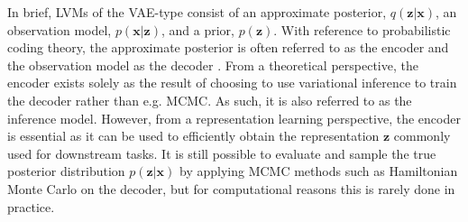 {In brief, LVMs of the VAE-type consist of an approximate posterior, $q(\mathbf{z}|\mathbf{x})$, an observation model, $p(\mathbf{x}|\mathbf{z})$, and a prior, $p(\mathbf{z})$. 
With reference to probabilistic coding theory, the approximate posterior is often referred to as the encoder and the observation model as the decoder \parencite{kingma_autoencoding_2014, rezende_stochastic_2014}. From a theoretical perspective, the encoder exists solely as the result of choosing to use variational inference to train the decoder rather than e.g. MCMC. As such, it is also referred to as the inference model. However, from a representation learning perspective, the encoder is essential as it can be used to efficiently obtain the representation $\mathbf{z}$ commonly used for downstream tasks. 
It is still possible to evaluate and sample the true posterior distribution $p(\mathbf{z}|\mathbf{x})$ by applying MCMC methods such as Hamiltonian Monte Carlo on the decoder, but for computational reasons this is rarely done in practice. 

}
